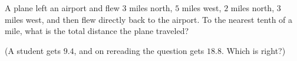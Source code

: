 A plane left an airport and flew $3$ miles north, $5$ miles west, $2$ miles north, $3$ miles west, and then flew directly back to the airport. To the nearest tenth of a mile, what is the total distance the plane traveled?

(A student gets $9.4$, and on rereading the question gets $18.8$. Which is right?)
